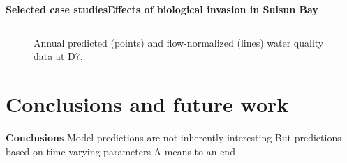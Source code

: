 \documentclass[serif]{beamer}\usepackage[]{graphicx}\usepackage[]{color}
\begin{document}
\begin{frame}{\textbf{Selected case studies}}{\textbf{Effects of biological invasion in Suisun Bay}}
\begin{columns}
\begin{column}{0.35\textwidth}
{}
\end{column}
\begin{column}{0.35\textwidth}
\end{column}
\end{columns}
\vspace{-0.05in}
\begin{figure}
\caption{Annual predicted (points) and flow-normalized (lines) water quality data at D7.}
\end{figure}
\end{frame}



\section{Conclusions and future work}

\begin{frame}{\textbf{Conclusions}}{\textbf{}}
Model predictions are not inherently interesting
But predictions based on time-varying parameters
A means to an end 
\end{frame}
\end{document}
